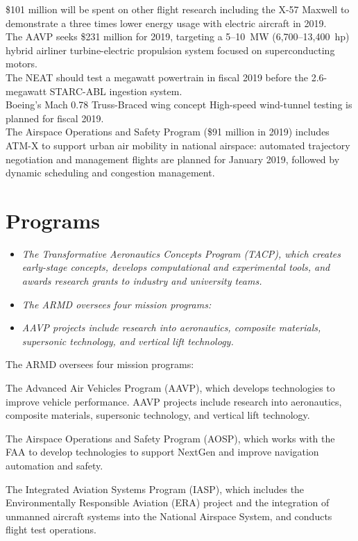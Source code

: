 \$101 million will be spent on other flight research including the X-57
Maxwell to demonstrate a three times lower energy usage with electric
aircraft in 2019.\\
The AAVP seeks \$231 million for 2019, targeting a 5--10~MW
(6,700--13,400~hp) hybrid airliner turbine-electric propulsion system
focused on superconducting motors.\\
The NEAT should test a megawatt powertrain in fiscal 2019 before the
2.6-megawatt STARC-ABL ingestion system.\\
Boeing's Mach 0.78 Truss-Braced wing concept High-speed wind-tunnel
testing is planned for fiscal 2019.\\
The Airspace Operations and Safety Program (\$91 million in 2019)
includes ATM-X to support urban air mobility in national airspace:
automated trajectory negotiation and management flights are planned for
January 2019, followed by dynamic scheduling and congestion management.

\section{Programs}\label{programs}

\begin{itemize}
\item
  \emph{The Transformative Aeronautics Concepts Program (TACP), which
  creates early-stage concepts, develops computational and experimental
  tools, and awards research grants to industry and university teams.}
\item
  \emph{The ARMD oversees four mission programs:}
\item
  \emph{AAVP projects include research into aeronautics, composite
  materials, supersonic technology, and vertical lift technology.}
\end{itemize}

The ARMD oversees four mission programs:

The Advanced Air Vehicles Program (AAVP), which develops technologies to
improve vehicle performance. AAVP projects include research into
aeronautics, composite materials, supersonic technology, and vertical
lift technology.

The Airspace Operations and Safety Program (AOSP), which works with the
FAA to develop technologies to support NextGen and improve navigation
automation and safety.

The Integrated Aviation Systems Program (IASP), which includes the
Environmentally Responsible Aviation (ERA) project and the integration
of unmanned aircraft systems into the National Airspace System, and
conducts flight test operations.

